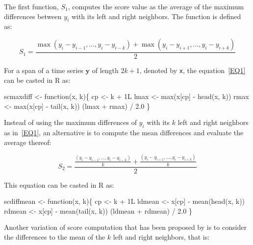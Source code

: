\documentclass[a4paper]{article}
\begin{document}
The first function, $S_1$, computes the score value as the average of
the maximum differences between $y_i$ with its left and right
neighbors. The function is defined as:

\begin{equation}
\label{EQ1}
S_1 =
  \frac{\max{(y_i - y_{i-1}, \ldots, y_i - y_{i-k})} + \max{(y_i -
  y_{i+1}, \ldots, y_i - y_{i+k})}}{2}
\end{equation}

For a span of a time series $\mathbf{y}$ of length $2k + 1$, denoted
by \texttt{x}, the equation~\eqref{EQ1} can be casted in R as:

\endmoddef
scmaxdiff <- function(x, k)\{
    cp <- k + 1L
    lmax <- max(x[cp] - head(x, k))
    rmax <- max(x[cp] - tail(x, k))
    (lmax + rmax) / 2.0
\}
\eatline
{}\nwendcode{}%

Instead of using the maximum differences of $y_i$ with its $k$ left
and right neighbors as in~\eqref{EQ1}, an alternative is to compute
the mean differences and evaluate the average thereof:

\begin{equation}
\label{EQ2}
S_2 = \frac{\frac{(y_i - y_{i-1}, \ldots, y_i - y_{i-k})}{k} +
\frac{(y_i - y_{i+1}, \ldots, y_i - y_{i+k})}{k}}{2}
\end{equation}

This equation can be casted in R as:

\nwenddocs{}\endmoddef
scdiffmean <- function(x, k)\{
    cp <- k + 1L
    ldmean <- x[cp] - mean(head(x, k))
    rdmean <- x[cp] - mean(tail(x, k))
    (ldmean + rdmean) / 2.0
\}
\eatline
{}\nwendcode{}%

Another variation of score computation that has been proposed by
\citet{PAL2009} is to consider the differences to the mean of the $k$
left and right neighbors, that is:
\end{document}
